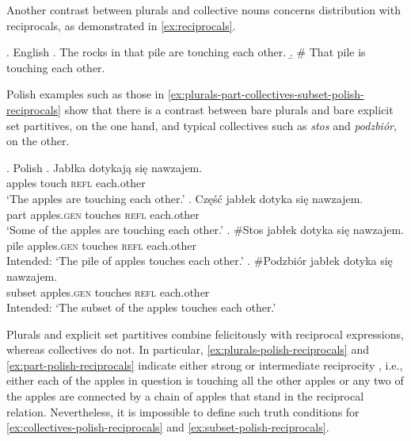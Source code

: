Another contrast between plurals and collective nouns concerns distribution with reciprocals, as demonstrated in \ref{ex:reciprocals}. 

\ex.\label{ex:reciprocals} English \citep[p. 168]{schwarzschild1996pluralities}
\a. The rocks in that pile are touching each other.\label{ex:reciprocals-plural}
\b. \# That pile is touching each other.\label{ex:reciprocals-group}

Polish examples such as those in \ref{ex:plurals-part-collectives-subset-polish-reciprocals} show that there is a contrast between bare plurals and bare explicit set partitives, on the one hand, and typical collectives such as \textit{stos} and \textit{podzbiór}, on the other. 

\ex.\label{ex:plurals-part-collectives-subset-polish-reciprocals} Polish
\ag. Jabłka dotykają się nawzajem.\label{ex:plurals-polish-reciprocals}\\
apples touch \textsc{refl} each.other\\
`The apples are touching each other.'
\bg. Część jabłek dotyka się nawzajem.\label{ex:part-polish-reciprocals}\\
part apples\textsc{.gen} touches \textsc{refl} each.other\\
`Some of the apples are touching each other.'
\bg. \#Stos jabłek dotyka się nawzajem.\label{ex:collectives-polish-reciprocals}\\
pile apples\textsc{.gen} touches \textsc{refl} each.other\\
Intended: `The pile of apples touches each other.'
\bg. \#Podzbiór jabłek dotyka się nawzajem.\label{ex:subset-polish-reciprocals}\\
subset apples\textsc{.gen} touches \textsc{refl} each.other\\
Intended: `The subset of the apples touches each other.'

Plurals and explicit set partitives combine felicitously with reciprocal expressions, whereas collectives do not. In particular, \ref{ex:plurals-polish-reciprocals} and \ref{ex:part-polish-reciprocals} indicate either strong or intermediate reciprocity \citep{fiengo_lasnik1973logical,dalrymple1998reciprocal,beck2001reciprocals}, i.e., either each of the apples in question is touching all the other apples or any  two of the apples are connected by a chain of apples that  stand in the reciprocal relation. Nevertheless, it is impossible to define such truth conditions for \ref{ex:collectives-polish-reciprocals} and \ref{ex:subset-polish-reciprocals}.

